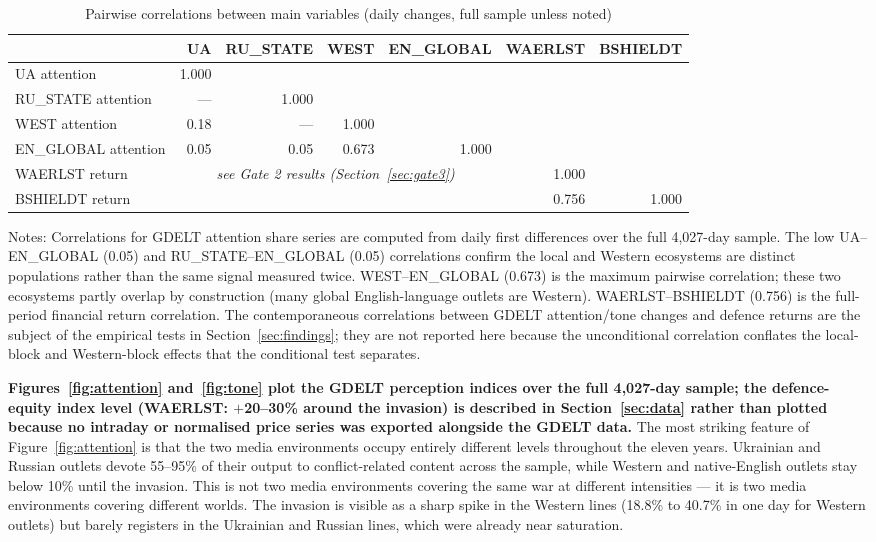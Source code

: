 \documentclass[12pt,a4paper]{article}
\begin{document}
\begin{table}[H]
\centering
\caption{Pairwise correlations between main variables (daily changes, full sample unless noted)}
\label{tab:correlations}
\begin{threeparttable}
\begin{tabular}{lrrrrrr}
\toprule
 & UA & RU\_STATE & WEST & EN\_GLOBAL & WAERLST & BSHIELDT \\
\midrule
UA attention & 1.000 & & & & & \\
RU\_STATE attention & --- & 1.000 & & & & \\
WEST attention & 0.18 & --- & 1.000 & & & \\
EN\_GLOBAL attention & 0.05 & 0.05 & 0.673 & 1.000 & & \\
WAERLST return & \multicolumn{4}{c}{\textit{see Gate 2 results (Section~\ref{sec:gate3})}} & 1.000 & \\
BSHIELDT return & & & & & 0.756 & 1.000 \\
\bottomrule
\end{tabular}
\begin{tablenotes}
\small
\item Notes: Correlations for GDELT attention share series are computed from daily first differences over the full 4,027-day sample. The low UA--EN\_GLOBAL (0.05) and RU\_STATE--EN\_GLOBAL (0.05) correlations confirm the local and Western ecosystems are distinct populations rather than the same signal measured twice. WEST--EN\_GLOBAL (0.673) is the maximum pairwise correlation; these two ecosystems partly overlap by construction (many global English-language outlets are Western). WAERLST--BSHIELDT (0.756) is the full-period financial return correlation. The contemporaneous correlations between GDELT attention/tone changes and defence returns are the subject of the empirical tests in Section~\ref{sec:findings}; they are not reported here because the unconditional correlation conflates the local-block and Western-block effects that the conditional test separates.
\end{tablenotes}
\end{threeparttable}
\end{table}

\textbf{Figures~\ref{fig:attention} and~\ref{fig:tone} plot the GDELT perception indices over the full 4,027-day sample; the defence-equity index level (WAERLST: $+$20--30\% around the invasion) is described in Section~\ref{sec:data} rather than plotted because no intraday or normalised price series was exported alongside the GDELT data.} The most striking feature of Figure~\ref{fig:attention} is that the two media environments occupy entirely different levels throughout the eleven years. Ukrainian and Russian outlets devote 55--95\% of their output to conflict-related content across the sample, while Western and native-English outlets stay below 10\% until the invasion. This is not two media environments covering the same war at different intensities --- it is two media environments covering different worlds. The invasion is visible as a sharp spike in the Western lines (18.8\% to 40.7\% in one day for Western outlets) but barely registers in the Ukrainian and Russian lines, which were already near saturation.
\end{document}

